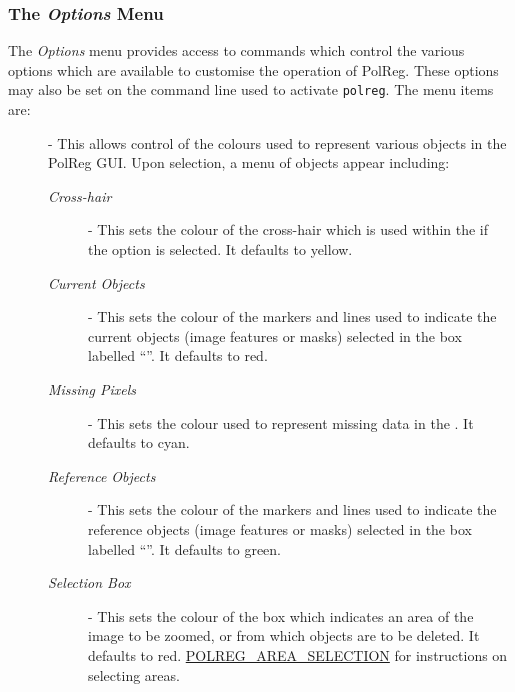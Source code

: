 \subsubsection {The {\em Options} Menu}
The {\em Options} menu provides access to commands which control the
various options which are available to customise the operation of PolReg.
These options may also be set on the command line used to activate 
{\tt polreg}. The menu items are:

\begin{description} 

\item [] - 
This allows control of the colours used to represent various objects in
the PolReg GUI. Upon selection, a menu of objects appear including:

\begin{description}

\item [{\em Cross-hair}] - This sets the colour of the cross-hair which
is used within the  if
the  option is
selected. It defaults to yellow.

\item [{\em Current Objects}] - This sets the colour of the markers and
lines used to indicate the current objects (image features or masks)
selected in the box labelled ``''.
It defaults to red.

\item [{\em Missing Pixels}] -  This sets the colour used to represent
missing data in the .
It defaults to cyan.

\item [{\em Reference Objects}] - This sets the colour of the markers and
lines used to indicate the reference objects (image features or masks)
selected in the box labelled ``''.
It defaults to green.

\item [{\em Selection Box}] - This sets the colour of the box
which indicates an area of the image to be zoomed, or from which objects
are to be deleted. It defaults to red. \hyperref{Go here}{See
section }{}{POLREG_AREA_SELECTION} for instructions on selecting areas.

\end{description}


\end{description}

